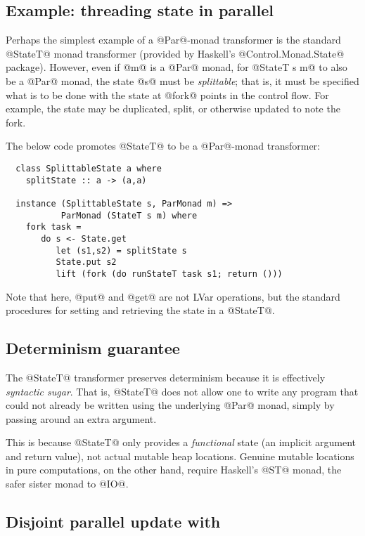 \subsection{Example: threading state in parallel}

Perhaps the simplest example of a @Par@-monad transformer is the
standard @StateT@ monad transformer (provided by Haskell's
@Control.Monad.State@ package).  However, even if @m@ is a @Par@
monad, for @StateT s m@ to also be a @Par@ monad, the state @s@ must
be \emph{splittable}; that is, it must be specified what is to be done
with the state at @fork@ points in the control flow.  For example, the
state may be duplicated, split, or otherwise updated to note the fork.

The below code promotes @StateT@ to be a @Par@-monad transformer:

\singlespacing
\begin{lstlisting}
  class SplittableState a where
    splitState :: a -> (a,a)

  instance (SplittableState s, ParMonad m) => 
           ParMonad (StateT s m) where  
    fork task =
       do s <- State.get 
          let (s1,s2) = splitState s
          State.put s2
          lift (fork (do runStateT task s1; return ()))
\end{lstlisting}
\doublespacing

Note that here, @put@ and @get@ are not LVar operations, but the
standard procedures for setting and retrieving the state in a
@StateT@.

\subsection{Determinism guarantee}

The @StateT@ transformer preserves determinism because it is
effectively \emph{syntactic sugar}.  That is, @StateT@ does not allow
one to write any program that could not already be written using the
underlying @Par@ monad, simply by passing around an extra argument.

This is because @StateT@ only provides a \emph{functional} state (an
implicit argument and return value), not actual mutable heap
locations.  Genuine mutable locations in pure computations, on the
other hand, require Haskell's @ST@ monad, the safer sister monad to
@IO@.

\subsection{Disjoint parallel update with }

